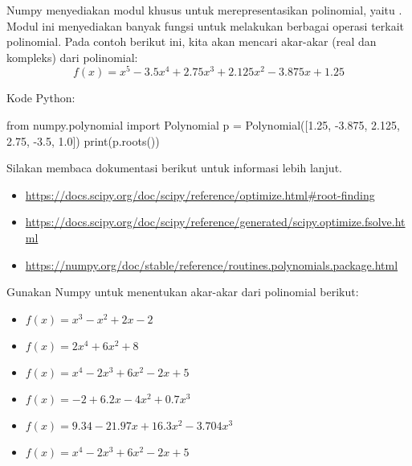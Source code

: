 Numpy menyediakan modul khusus untuk merepresentasikan polinomial, yaitu
. Modul ini menyediakan banyak fungsi untuk
melakukan berbagai operasi terkait polinomial.
Pada contoh berikut ini, kita akan mencari akar-akar (real dan kompleks)
dari polinomial:
\begin{equation*}
f(x) = x^5 - 3.5x^4 + 2.75x^3 + 2.125x^2 - 3.875x + 1.25
\end{equation*}

Kode Python:
\begin{pythoncode}
from numpy.polynomial import Polynomial
p = Polynomial([1.25, -3.875, 2.125, 2.75, -3.5, 1.0])
print(p.roots())
\end{pythoncode}

Silakan membaca dokumentasi berikut untuk informasi lebih lanjut.
\begin{itemize}
\item {\scriptsize\url{https://docs.scipy.org/doc/scipy/reference/optimize.html\#root-finding}}
\item {\scriptsize\url{https://docs.scipy.org/doc/scipy/reference/generated/scipy.optimize.fsolve.html}}
\item {\scriptsize\url{https://numpy.org/doc/stable/reference/routines.polynomials.package.html}}
\end{itemize}


Gunakan Numpy untuk menentukan akar-akar dari polinomial berikut:
\begin{itemize}
\item $f(x) = x^3 - x^2 + 2x - 2$
\item $f(x) = 2x^4 + 6x^2 + 8$
\item $f(x) = x^4 - 2x^3 + 6x^2 - 2x + 5$
\item $f(x) = -2 + 6.2x - 4x^2 + 0.7x^3$
\item $f(x) = 9.34 - 21.97x + 16.3x^2 - 3.704x^3$
\item $f(x) = x^4 - 2x^3 + 6x^2 - 2x + 5$
\end{itemize}

